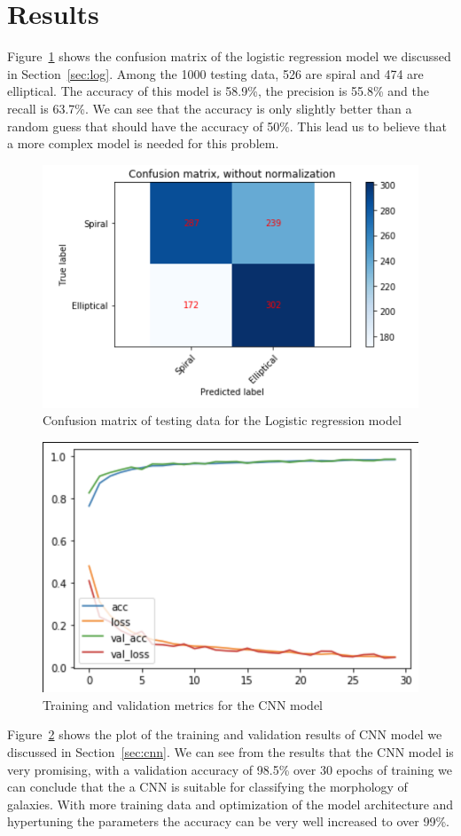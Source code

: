 \section{Results}
\label{sec:res}
Figure~\ref{fig:log_cm} shows the confusion matrix of the logistic regression model we discussed in Section~\ref{sec:log}. Among the 1000 testing data, 526 are spiral and 474 are elliptical. The accuracy of this model is 58.9\%, the precision is 55.8\% and the recall is 63.7\%. We can see that the accuracy is only slightly better than a random guess that should have the accuracy of 50\%. This lead us to believe that a more complex model is needed for this problem.

\begin{figure}[h]
	\centering
	\captionsetup{justification=centering}
	\includegraphics[width=0.6\columnwidth]{Figures/log_cm.png}
	\caption{Confusion matrix of testing data for the Logistic regression model}
	\label{fig:log_cm}
\end{figure}


\begin{figure}[h]
	\centering
	\captionsetup{justification=centering}
	\includegraphics[width=0.4\columnwidth]{Figures/CNNMetrics.png}
	\caption{Training and validation metrics for the CNN model}
	\label{fig:cnnmetrics}
\end{figure}

Figure~\ref{fig:cnnmetrics} shows the plot of the training and validation results of CNN model we discussed in Section~\ref{sec:cnn}. 
We can see from the results that the CNN model is very promising, with a validation accuracy of 98.5\% over 30 epochs of training we can conclude that the a CNN is suitable for classifying the morphology of galaxies. With more training data and optimization of the model architecture and hypertuning the parameters the accuracy can be very well increased to over 99\%.